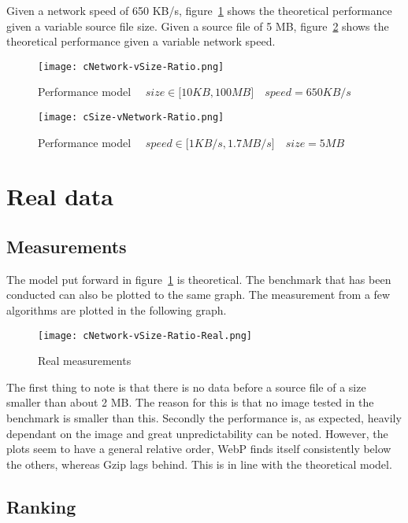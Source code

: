 \documentclass[11pt,a4paper]{report}
\begin{document}
Given a network speed of 650 KB/s, figure~\ref{fig:cNetwork-vSize-Ratio} shows the theoretical performance given a variable source file size. Given a source file of 5 MB, figure~\ref{fig:cSize-vNetwork-Ratio} shows the theoretical performance given a variable network speed.

\begin{figure}[!htb]
\centering
\texttt{[image: cNetwork-vSize-Ratio.png]}
\caption{\label{fig:cNetwork-vSize-Ratio} Performance model $\quad size \in \lbrack10KB, 100MB\rbrack \quad speed = 650KB/s$}
\end{figure}

\begin{figure}[!htb]
\centering
\texttt{[image: cSize-vNetwork-Ratio.png]}
\caption{\label{fig:cSize-vNetwork-Ratio} Performance model $\quad speed \in \lbrack 1KB/s, 1.7MB/s\rbrack \quad size = 5MB$}
\end{figure}

\newpage
\section{Real data}

\subsection{Measurements}

The model put forward in figure~\ref{fig:cNetwork-vSize-Ratio} is theoretical. The benchmark that has been conducted can also be plotted to the same graph. The measurement from a few algorithms are plotted in the following graph.

\begin{figure}[ht!]
\centering
\texttt{[image: cNetwork-vSize-Ratio-Real.png]}
\caption{\label{fig:cNetwork-vSize-Ratio-Real} Real measurements}
\end{figure}

The first thing to note is that there is no data before a source file of a size smaller than about 2 MB. The reason for this is that no image tested in the benchmark is smaller than this. Secondly the performance is, as expected, heavily dependant on the image and great unpredictability can be noted. However, the plots seem to have a general relative order, WebP finds itself consistently below the others, whereas Gzip lags behind. This is in line with the theoretical model.

\newpage
\subsection{Ranking}
\end{document}
